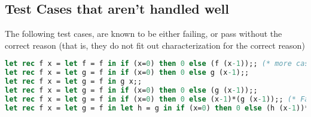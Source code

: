 \subsection{Test Cases that aren't handled well}

The following test cases, are known to be either failing, or pass without the correct reason (that is, they do not fit out characterization for the correct reason)
\begin{lstlisting}[language=Caml, caption=Unhandled Test Cases]
let rec f x = let f = f in if (x=0) then 0 else (f (x-1));; (* more cases for LetIn: aliases *)
let rec f x = let g = f in if (x=0) then 0 else g (x-1);;
let rec f x = let g = f in g x;;
let rec f x = let g = f in if (x=0) then 0 else (g (x-1));;
let rec f x = let g = f in if (x=0) then 0 else (x-1)*(g (x-1));; (* Failed with both styles since we can't handle aliases well *)
let rec f x = let g = f in let h = g in if (x=0) then 0 else (h (x-1))*(x-1);; (* Failed with both styles since we can't handle aliases well *)
\end{lstlisting}
